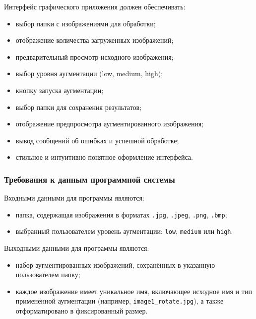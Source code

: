 Интерфейс графического приложения должен обеспечивать:

\begin{itemize}
	\item выбор папки с изображениями для обработки;
	\item отображение количества загруженных изображений;
	\item предварительный просмотр исходного изображения;
	\item выбор уровня аугментации (low, medium, high);
	\item кнопку запуска аугментации;
	\item выбор папки для сохранения результатов;
	\item отображение предпросмотра аугментированного изображения;
	\item вывод сообщений об ошибках и успешной обработке;
	\item стильное и интуитивно понятное оформление интерфейса.
\end{itemize}

\subsubsection{Требования к данным программной системы}

Входными данными для программы являются:
\begin{itemize}
	\item папка, содержащая изображения в форматах \texttt{.jpg}, \texttt{.jpeg}, \texttt{.png}, \texttt{.bmp};
	\item выбранный пользователем уровень аугментации: \texttt{low}, \texttt{medium} или \texttt{high}.
\end{itemize}

Выходными данными для программы являются:
\begin{itemize}
	\item набор аугментированных изображений, сохранённых в указанную пользователем папку;
	\item каждое изображение имеет уникальное имя, включающее исходное имя и тип применённой аугментации (например, \texttt{image1\_rotate.jpg}), а также отформатировано в фиксированный размер.
\end{itemize}



